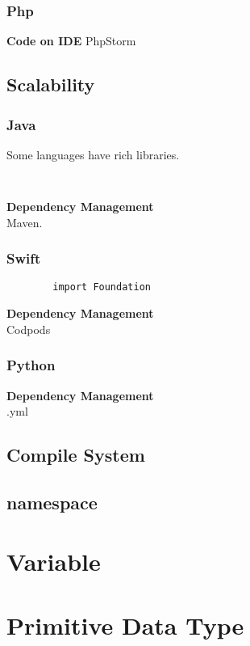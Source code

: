 \documentclass[12pt, a4pape]{article}
\begin{document}
		\subsubsection{Php}
			\textbf{Code on IDE} PhpStorm
		
	\subsection{Scalability}
		\subsubsection{Java}
		Some languages have rich libraries. \\
		\begin{lstlisting}
		
		\end{lstlisting}
		\textbf{Dependency Management} \\
		Maven.
		
		\subsubsection{Swift}
		\begin{lstlisting}
		import Foundation
		\end{lstlisting}
		\textbf{Dependency Management} \\
		Codpods
		
		\subsubsection{Python}
		\textbf{Dependency Management} \\
		.yml

	\subsection{Compile System}
	
	\subsection{namespace}
	
	
\section{Variable}
	
\section{Primitive Data Type}
\end{document}

